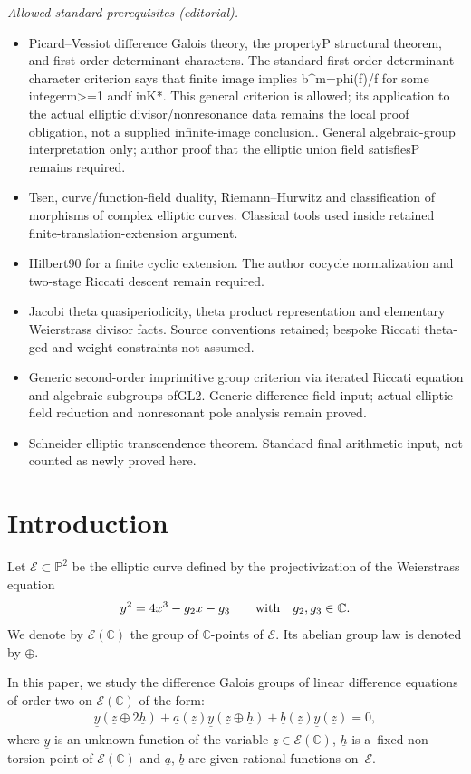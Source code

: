 \documentclass[10pt,a4paper]{amsart}
\numberwithin{equation}{section}
\begin{document}
\noindent\textit{Allowed standard prerequisites (editorial).}\begin{itemize}
\item Picard–Vessiot difference Galois theory, the propertyP structural theorem, and first-order determinant characters. The standard first-order determinant-character criterion says that finite image implies b\textasciicircum{}m=phi(f)/f for some integerm>=1 andf inK*. This general criterion is allowed; its application to the actual elliptic divisor/nonresonance data remains the local proof obligation, not a supplied infinite-image conclusion.. General algebraic-group interpretation only; author proof that the elliptic union field satisfiesP remains required.
\item Tsen, curve/function-field duality, Riemann–Hurwitz and classification of morphisms of complex elliptic curves. Classical tools used inside retained finite-translation-extension argument.
\item Hilbert90 for a finite cyclic extension. The author cocycle normalization and two-stage Riccati descent remain required.
\item Jacobi theta quasiperiodicity, theta product representation and elementary Weierstrass divisor facts. Source conventions retained; bespoke Riccati theta-gcd and weight constraints not assumed.
\item Generic second-order imprimitive group criterion via iterated Riccati equation and algebraic subgroups ofGL2. Generic difference-field input; actual elliptic-field reduction and nonresonant pole analysis remain proved.
\item Schneider elliptic transcendence theorem. Standard final arithmetic input, not counted as newly proved here.
\end{itemize}\medskip
\section{Introduction}

Let $\mathcal{E} \subset \mathbb{P}^{2}$ be the elliptic curve def\/ined by the projectivization of the Weierstrass
equation
\begin{gather}
\label{Weierstrass equation}
y^{2}=4x^{3}-g_{2}x-g_{3} \qquad \hbox{with} \quad g_{2},g_{3} \in \mathbb C.
\end{gather}
We denote by $\mathcal{E}(\mathbb C)$ the group of $\mathbb C$-points of $\mathcal{E}$.
Its abelian group law is denoted by $\oplus$.

In this paper, we study the dif\/ference Galois groups of linear dif\/ference equations of order two on $\mathcal{E}(\mathbb
C)$ of the form:
\begin{gather}
\label{equa sur courbe elliptique generique}
\underline{y}(\underline{z} \oplus 2\underline{h}) + \underline{a}(\underline{z}) \underline{y}(\underline{z}\oplus
\underline{h}) + \underline{b}(\underline{z}) \underline{y}(\underline{z}) =0,
\end{gather}
where $\underline{y}$ is an unknown function of the variable $\underline{z} \in \mathcal{E}(\mathbb C)$, $\underline{h}$
is a~f\/ixed non torsion point of $\mathcal{E}(\mathbb C)$ and $\underline{a}$, $\underline{b}$ are given rational functions
on~$\mathcal{E}$.
\end{document}
